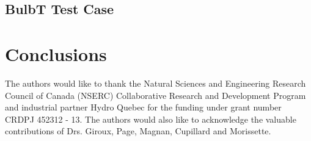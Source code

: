 \documentclass[twocolumn,10pt]{asme2ej}
\begin{document}
\subsection{BulbT Test Case}


\section{Conclusions}


\begin{acknowledgment}
The authors would like to thank the Natural Sciences and Engineering Research Council of Canada (NSERC) Collaborative Research and Development Program and industrial partner Hydro Quebec for the funding under grant number CRDPJ 452312 - 13. The authors would also like to acknowledge the valuable contributions of Drs. Giroux, Page, Magnan, Cupillard and Morissette.
\end{acknowledgment}
\FloatBarrier
%




%
\end{document}
